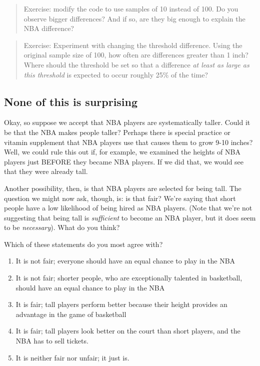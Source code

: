 \documentclass[openany]{book}
\providecommand{\tightlist}{%
  \setlength{\itemsep}{0pt}\setlength{\parskip}{0pt}}
\begin{document}
\begin{quote}
Exercise: modify the code to use samples of 10 instead of 100. Do you observe bigger differences? And if so, are they big enough to explain the NBA difference?
\end{quote}

\begin{quote}
Exercise: Experiment with changing the threshold difference. Using the original sample size of 100, how often are differences greater than 1 inch? Where should the threshold be set so that a difference \emph{at least as large as this threshold} is expected to occur roughly 25\% of the time?
\end{quote}

\hypertarget{none-of-this-is-surprising}{%
\subsection*{None of this is surprising}\label{none-of-this-is-surprising}}

Okay, so suppose we accept that NBA players are systematically taller. Could it be that the NBA makes people taller? Perhaps there is special practice or vitamin supplement that NBA players use that causes them to grow 9-10 inches? Well, we could rule this out if, for example, we examined the heights of NBA players just BEFORE they became NBA players. If we did that, we would see that they were already tall.

Another possibility, then, is that NBA players are selected for being tall. The question we might now ask, though, is: is that fair? We're saying that short people have a low likelihood of being hired as NBA players. (Note that we're not suggesting that being tall is \emph{sufficient} to become an NBA player, but it does seem to be \emph{necessary}). What do you think?

Which of these statements do you most agree with?

\begin{enumerate}
\def\labelenumi{\arabic{enumi}.}
\tightlist
\item
  It is not fair; everyone should have an equal chance to play in the NBA
\item
  It is not fair; shorter people, who are exceptionally talented in basketball, should have an equal chance to play in the NBA
\item
  It is fair; tall players perform better because their height provides an advantage in the game of basketball
\item
  It is fair; tall players look better on the court than short players, and the NBA has to sell tickets.
\item
  It is neither fair nor unfair; it just is.
\end{enumerate}
\end{document}
